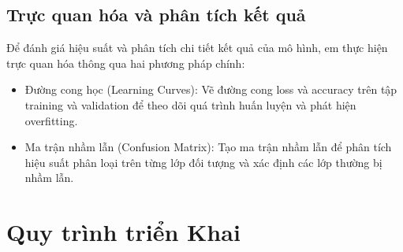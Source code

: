 \documentclass[12pt, a4paper, openany]{report}
\begin{document}
\section{Trực quan hóa và phân tích kết quả}
Để đánh giá hiệu suất và phân tích chi tiết kết quả của mô hình, em thực hiện trực quan hóa thông qua hai phương pháp chính:
\begin{itemize}
    \item Đường cong học (Learning Curves): Vẽ đường cong loss và accuracy trên tập training và validation để theo dõi quá trình huấn luyện và phát hiện overfitting.
    \item Ma trận nhầm lẫn (Confusion Matrix): Tạo ma trận nhầm lẫn để phân tích hiệu suất phân loại trên từng lớp đối tượng và xác định các lớp thường bị nhầm lẫn.
\end{itemize}

\chapter{Quy trình triển Khai}
\end{document}
